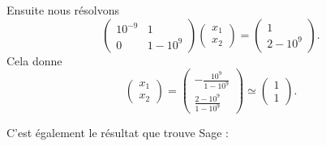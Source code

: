 \begin{example}
    Ensuite nous résolvons
    \begin{equation}
        \begin{pmatrix}
            10^{-9}    &   1    \\ 
            0    &   1-10^9    
        \end{pmatrix}\begin{pmatrix}
            x_1    \\ 
            x_2    
        \end{pmatrix}=\begin{pmatrix}
            1    \\ 
            2-10^9    
        \end{pmatrix}.
    \end{equation}
    Cela donne
    \begin{equation}
        \begin{pmatrix}
            x_1    \\ 
            x_2    
        \end{pmatrix}=\begin{pmatrix}
            -\frac{ 10^9 }{ 1-10^9 }    \\ 
            \frac{ 2-10^9 }{ 1-10^9 }    
        \end{pmatrix}\simeq\begin{pmatrix}
            1    \\ 
            1    
        \end{pmatrix}.
    \end{equation}

    C'est également le résultat que trouve Sage :
    
\end{example}

